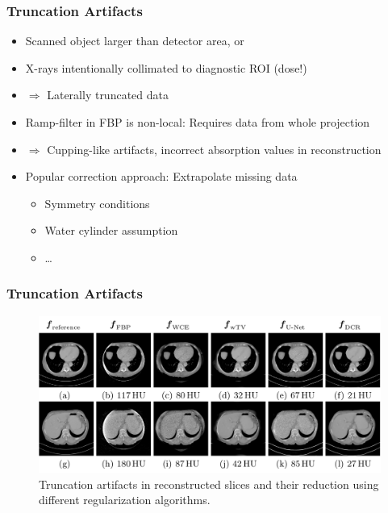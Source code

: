 \begin{frame}
	\frametitle{Truncation Artifacts}

	\begin{itemize}
		\setlength\itemsep{0.3cm}
		\item Scanned object larger than detector area, or
		\item X-rays intentionally collimated to diagnostic ROI (dose!)
		\item[ ] $\Rightarrow$ Laterally truncated data
		\item Ramp-filter in FBP is non-local: Requires data from whole projection
		\item[ ] $\Rightarrow$ Cupping-like artifacts, incorrect absorption values in reconstruction
		\item Popular correction approach: Extrapolate missing data
		      \begin{itemize}
			      \item Symmetry conditions
			      \item Water cylinder assumption
			      \item \ldots
		      \end{itemize}
	\end{itemize}

\end{frame}

\begin{frame}
	\frametitle{Truncation Artifacts}

	\begin{figure}[tbp]
		\centering
		\includegraphics[width=0.8\linewidth]{images/truncation_yixing.png}
		\caption{Truncation artifacts in reconstructed slices and their reduction using different regularization algorithms.}%
		\label{fig:ct_truncation}
	\end{figure}
	\flushright{}
	\tiny


\end{frame}


